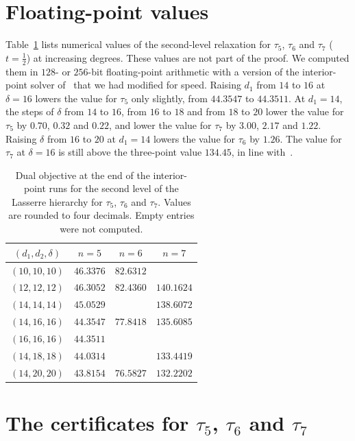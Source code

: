 \documentclass[11pt]{amsart}
\theoremstyle{remark}
\begin{document}
\section{Floating-point values}\label{sec:values}

Table~\ref{tab:values} lists numerical values of the second-level relaxation for $\tau_5$, $\tau_6$ and $\tau_7$ ($t=\frac12$) at increasing degrees. These values are not part of the proof. We computed them in $128$- or $256$-bit floating-point arithmetic with a version of the interior-point solver of~\cite{LdL} that we had modified for speed. Raising $d_1$ from $14$ to $16$ at $\delta=16$ lowers the value for $\tau_5$ only slightly, from $44.3547$ to $44.3511$. At $d_1=14$, the steps of $\delta$ from $14$ to $16$, from $16$ to $18$ and from $18$ to $20$ lower the value for $\tau_5$ by $0.70$, $0.32$ and $0.22$, and lower the value for $\tau_7$ by $3.00$, $2.17$ and $1.22$. Raising $\delta$ from $16$ to $20$ at $d_1=14$ lowers the value for $\tau_6$ by $1.26$. The value for $\tau_7$ at $\delta=16$ is still above the three-point value $134.45$, in line with~\cite{LLM}.

\begin{table}[ht]
\centering
\begin{tabular}{cccc}
\toprule
$(d_1,d_2,\delta)$ & $n=5$ & $n=6$ & $n=7$ \\
\midrule
$(10,10,10)$ & $46.3376$ & $82.6312$ & \\
$(12,12,12)$ & $46.3052$ & $82.4360$ & $140.1624$ \\
$(14,14,14)$ & $45.0529$ & & $138.6072$ \\
$(14,16,16)$ & $44.3547$ & $77.8418$ & $135.6085$ \\
$(16,16,16)$ & $44.3511$ & & \\
$(14,18,18)$ & $44.0314$ & & $133.4419$ \\
$(14,20,20)$ & $43.8154$ & $76.5827$ & $132.2202$ \\
\bottomrule
\end{tabular}
\medskip
\caption{Dual objective at the end of the interior-point runs for the second level of the Lasserre hierarchy for $\tau_5$, $\tau_6$ and $\tau_7$. Values are rounded to four decimals. Empty entries were not computed.}\label{tab:values}
\end{table}

\section{The certificates for \texorpdfstring{$\tau_5$}{tau5}, \texorpdfstring{$\tau_6$}{tau6} and \texorpdfstring{$\tau_7$}{tau7}}\label{sec:cert}
\end{document}
